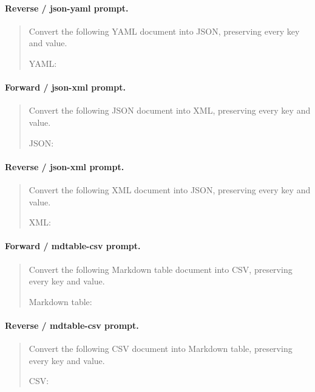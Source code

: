 \paragraph{Reverse / json-yaml prompt.}
\begin{quote}\small\ttfamily
Convert the following YAML document into JSON, preserving every key and value.\par \par YAML:\par <INPUT B>
\end{quote}
\paragraph{Forward / json-xml prompt.}
\begin{quote}\small\ttfamily
Convert the following JSON document into XML, preserving every key and value.\par \par JSON:\par <INPUT A>
\end{quote}
\paragraph{Reverse / json-xml prompt.}
\begin{quote}\small\ttfamily
Convert the following XML document into JSON, preserving every key and value.\par \par XML:\par <INPUT B>
\end{quote}
\paragraph{Forward / mdtable-csv prompt.}
\begin{quote}\small\ttfamily
Convert the following Markdown table document into CSV, preserving every key and value.\par \par Markdown table:\par <INPUT A>
\end{quote}
\paragraph{Reverse / mdtable-csv prompt.}
\begin{quote}\small\ttfamily
Convert the following CSV document into Markdown table, preserving every key and value.\par \par CSV:\par <INPUT B>
\end{quote}
